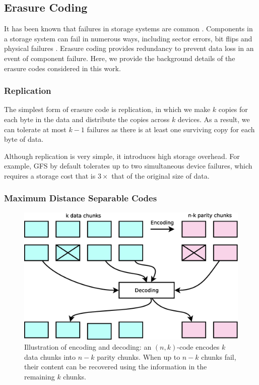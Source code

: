 
\subsection{Erasure Coding}
\label{sec:ec_background}

It has been known that failures in storage systems are common \cite{ghemawat03}.
Components in a storage system can fail in numerous ways, including sector
errors, bit flips and physical failures \cite{plank13}. Erasure coding provides
redundancy to prevent data loss in an event of component failure. Here, we
provide the background details of the erasure codes considered in
this work. 

\subsubsection{Replication}

The simplest form of erasure code is replication, in which we make $k$ copies
for each byte in the data and distribute the copies across $k$ devices. As a
result, we can tolerate at most $k-1$ failures as there is at least one
surviving copy for each byte of data.

Although replication is very simple, it introduces high storage overhead. For
example, GFS \cite{ghemawat03} by default tolerates up to two simultaneous
device failures, which requires a storage cost that is $3\times$ that of the original
size of data.

\subsubsection{Maximum Distance Separable Codes}


\begin{figure}[t]
    \centering
    \includegraphics[width=0.7\linewidth]{figs/erasure_code}
    \caption{Illustration of encoding and decoding: an $(n,k)$-code encodes $k$
        data chunks into $n-k$ parity chunks.  When up to $n-k$ chunks fail,
        their content can be recovered using the information in the remaining
        $k$ chunks.}
    \label{fig:erasure_code}
\end{figure}

